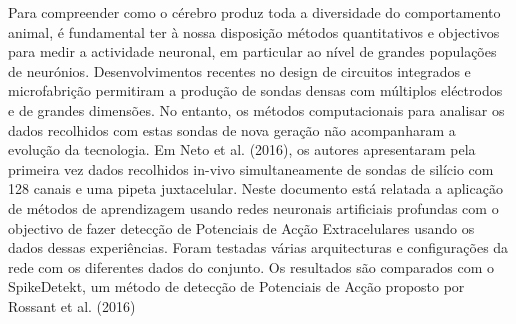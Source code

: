\begin{resumo}
Para compreender como o cérebro produz toda a diversidade do comportamento animal, é fundamental ter à nossa disposição métodos quantitativos e objectivos para medir a actividade neuronal, em particular ao nível de grandes populações de neurónios. Desenvolvimentos recentes no design de circuitos integrados e microfabrição permitiram a produção de sondas densas com múltiplos eléctrodos e de grandes dimensões. No entanto, os métodos computacionais para analisar os dados recolhidos com estas sondas de nova geração não acompanharam a evolução da tecnologia. Em Neto et al. (2016), os autores apresentaram pela primeira vez dados recolhidos in-vivo simultaneamente de sondas de silício com 128 canais e uma pipeta juxtacelular. Neste documento está relatada a aplicação de métodos de aprendizagem usando redes neuronais artificiais profundas com o objectivo de fazer detecção de Potenciais de Acção Extracelulares usando os dados dessas experiências. Foram testadas várias arquitecturas e configurações da rede com os diferentes dados do conjunto. Os resultados são comparados com o SpikeDetekt, um método de detecção de Potenciais de Acção proposto por Rossant et al. (2016)
\end{resumo}
